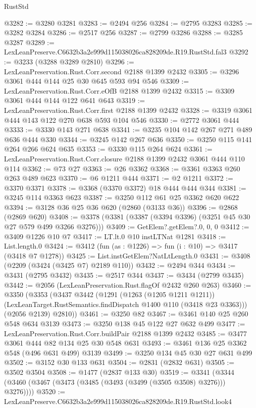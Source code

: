 \begin{lexlean}{RustStd}
\begin{coremodule}
@3282 := @3280 @3281
@3283 := @2494 @256
@3284 := @2795 @3283
@3285 := @3282 @3284
@3286 := @2517 @256
@3287 := @2799 @3286
@3288 := @3285 @3287
@3289 := LexLeanPreserve.C6632b3a2e999d115038026ca828209de.R19.RustStd.fal3
@3292 := @3233 (@3288 @3289 @2810)
@3296 := LexLeanPreservation.Rust.Corr.second @2188 @1399 @2432
@3305 := @3296 @3061 @444 @144 @25 @30 @645 @593 @94 @546
@3309 := LexLeanPreservation.Rust.Corr.eOfB @2188 @1399 @2432
@3315 := @3309 @3061 @444 @144 @122 @641 @643
@3319 := LexLeanPreservation.Rust.Corr.first @2188 @1399 @2432
@3328 := @3319 @3061 @444 @143 @122 @270 @638 @593 @104 @546
@3330 := @2772 @3061 @444
@3333 := @3330 @143 @271 @638
@3341 := @3235 @104 @142 @267 @271 @489 @636 @444 @330
@3344 := @3245 @142 @267 @636
@3350 := @3250 @115 @141 @264 @266 @624 @635
@3353 := @3330 @115 @264 @624
@3361 := LexLeanPreservation.Rust.Corr.closure @2188 @1399 @2432 @3061 @444 @110 @114
@3362 := @73 @27
@3363 := @26 @3362
@3368 := @3361 @3363 @260 @263 @489 @623
@3370 := @6 @1211 @444
@3371 := @2 @1211
@3372 := @3370 @3371
@3378 := @3368 (@3370 @3372) @18 @444 @444 @344
@3381 := @3245 @114 @3363 @623
@3387 := @3250 @112 @61 @25 @3362 @620 @622
@3394 := @3128 @36 @25 @36 @620 (@2860 (@3133 @36))
@3396 := @2868 (@2869 @620)
@3408 := @3378 (@3381 (@3387 (@3394 @3396) (@3251 @45 @30 @27 @579 @499 @3266 @3276)))
@3409 := GetElem?.getElem?.{0, 0, 0}
@3412 := @3409 @1226 @10 @7
@3417 := LT.lt.{0} @10 instLTNat @1281
@3418 := List.length.{0}
@3424 := @3412 (fun (as : @1226) => fun (i : @10) => @3417 (@3418 @7 @1278))
@3425 := List.instGetElem?NatLtLength.{0}
@3431 := @3408 (@2209 (@3424 (@3425 @7) @2189 @110))
@3432 := @2494 @344
@3434 := @3431 (@2795 @3432)
@3435 := @2517 @344
@3437 := @3434 (@2799 @3435)
@3442 := @2056 (LexLeanPreservation.Rust.flagOf @2432 @260 @263)
@3460 := @3350
    (@3353
      (@3437
        @3442
        (@1291
          (@1263 (@1205 @1211 @1211))
          (LexLeanTarget.RustSemantics.findDispatch @1400 @110 (@3418 @23 @3363)))
        (@2056 @2139)
        @2810))
@3461 := @3250 @82
@3467 := @3461 @140 @25 @260 @548 @634 @3139
@3473 := @3250 @138 @45 @122 @27 @632 @499
@3477 := LexLeanPreservation.Rust.Corr.buildPair @2188 @1399 @2432
@3485 := @3477 @3061 @444 @82 @134 @25 @30 @548 @631
@3493 := @3461 @136 @25 @3362 @548 (@496 @631 @499) @3139
@3499 := @3250 @134 @45 @30 @27 @631 @499
@3502 := @3152 @30 @133 @631
@3504 := @2831 (@2832 @631)
@3505 := @3502 @3504
@3508 := @1477 (@2837 @133 @30)
@3519 := @3341 (@3344 (@3460 (@3467 (@3473 (@3485 (@3493 (@3499 (@3505 @3508) @3276))) @3276))))
@3520 := LexLeanPreserve.C6632b3a2e999d115038026ca828209de.R19.RustStd.look4

\end{coremodule}
\end{lexlean}

